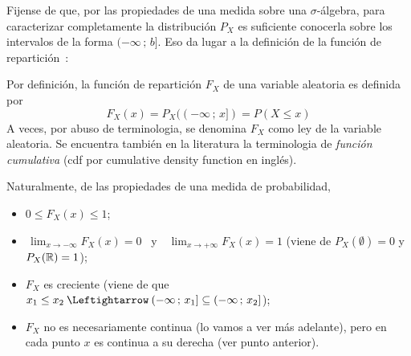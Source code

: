 Fijense de que, por las  propiedades de una medida sobre una $\sigma$-\'algebra,
para caracterizar completamente la  distribuci\'on $P_X$ es suficiente conocerla
sobre  los intervalos de  la forma  $(-\infty \,  ; \,  b]$. Eso  da lugar  a la
definici\'on  de  la funci\'on  de  repartici\'on~\cite{AthLah06, Coh13,  Bre88,
  HogMck13}:
%
\begin{definicion}
  Por  definici\'on,  la  funci\'on  de  repartici\'on  $F_X$  de  una  variable
  aleatoria es definida por
  \[
  F_X(x) = P_X((-\infty \, ; \, x]) = P(X \le x)
  \]
  A veces, por abuso de terminologia,  se denomina $F_X$ como ley de la variable
  aleatoria. Se  encuentra tambi\'en  en la literatura  la terminologia  de {\it
    funci\'on cumulativa} (cdf por cumulative density function en ingl\'es).
\end{definicion}
%
Naturalmente, de las propiedades de una medida de probabilidad,
%
\begin{itemize}
\item $0 \le F_X(x) \le 1$;
%
\item $\displaystyle \, \lim_{x \to -\infty} F_X(x) = 0$ \ y \ $\displaystyle \,
  \lim_{x \to +\infty} F_X(x) = 1$  (viene de $P_X(\emptyset) = 0$ y $P_X(\mathbb{R})
  = 1$);
%
\item  $F_X$ es creciente  \big(viene de  que \  $x_1 \le  x_2 \:  \Leftightarrow \:
  (-\infty \, ; \, x_1] \subseteq (-\infty \, ; \, x_2]$\big);
%
\item $F_X$ no es necesariamente continua  (lo vamos a ver m\'as adelante), pero
  en cada punto $x$ es continua a su derecha (ver punto anterior).
\end{itemize}



